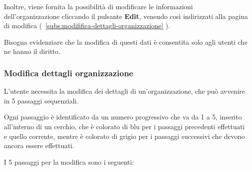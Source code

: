 \documentclass[../manuale-utente.tex]{subfiles}
\begin{document}
Inoltre, viene fornita la possibilità di modificare le informazioni dell'organizzazione cliccando il pulsante \textbf{Edit}, venendo così indirizzati alla pagina di modifica (~\ref{subs:modififica-dettagli-organizzazione} ). 

Bisogna evidenziare che la modifica di questi dati è consentita solo agli utenti che ne hanno il diritto.
\newpage





\subsubsection{Modifica dettagli organizzazione}%
\label{subs:modififica_dettagli_organizzazione}

L'utente necessita la modifica dei dettagli di un'organizzazione, che può avvenire in 5 passaggi sequenziali. 

Ogni passaggio è identificato da un numero progressivo che va da 1 a 5, inserito all'interno di un cerchio, che è colorato di blu per i passaggi precedenti effettuati e quello corrente, mentre è colorato di grigio per i passaggi successivi che devono ancora essere effettuati.

I 5 passaggi per la modifica sono i seguenti:
\end{document}
